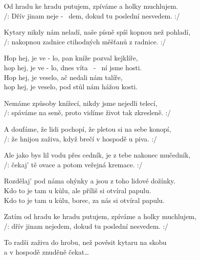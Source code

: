 
\ve{}
Od hradu ke hradu putujem, zpíváme a holky muchlujem.\\
/: Dřív jinam \quad {}neje - \ dem, dokud tu poslední nesvedem. :/

\ve{}
Kytary nikdy nám neladí, naše písně spíš kopnou než pohladí,\\
/: nakopnou zadnice ctihodných měšťanů z radnice. :/

\cho{}
Hop hej, je ve \quad - \quad {}lo, pan kníže \quad {}pozval kejklíře,\\
hop hej, je ve \quad - \quad {}lo, dnes víta \ - \ ní jsme hosti.\\
Hop hej, je veselo, ač nedali nám talíře,\\
hop hej, je veselo, pod stůl nám hážou kosti.

\ve{}
Nemáme způsoby knížecí, nikdy jsme nejedli telecí,\\
/: spáváme na seně, proto vidíme život tak zkresleně. :/

\ve{}
A doufáme, že lidi pochopí, že pletou si na sebe konopí,\\
/: že hnijou zaživa, když brečí v hospodě u piva. :/

\cho{}

\ve{}
Ale jako bys lil vodu přes cedník, je z tebe nakonec mučedník,\\
/: čekaj' tě ovace a potom veřejná kremace. :/

\ve{}
Rozdělaj' pod náma ohýnky a jsou z toho lidové dožínky.\\
Kdo to je tam u kůlu, ale příliš si otvíral papulu.\\
Kdo to je tam u kůlu, borec, za nás si otvíral papulu.

\cho{}

\ve{}
Zatím od hradu ke hradu putujem, zpíváme a holky muchlujem,\\
/: dřív jinam nejedem, dokud tu poslední nesvedem. :/

\ve{}
To radši zaživa do hrobu, než pověsit kytaru na skobu\\
a v hospodě znuděně čekat\ldots{}

\esong